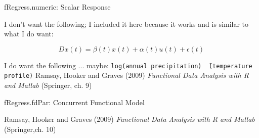 \documentclass[compress]{beamer}
\begin{document}
\begin{frame}{fRegress.numeric:  Scalar Response}



I don't want the following;  I included it here 
because it works and is similar to what I do want:  
\newline 

\[ D x(t) = \beta(t) x(t) + \alpha(t) u(t) + \epsilon(t) \]
\newline \newline \newline 


%




%
I do want the following ... maybe:  \newline
\texttt{log(annual precipitation) \~\ (temperature profile)}
\newline \newline \newline
Ramsay, Hooker and Graves (2009)
\emph{Functional Data Analysis with R and Matlab}
(Springer, ch. 9)

\end{frame}


\begin{frame}{fRegress.fdPar:  Concurrent Functional Model}

Ramsay, Hooker and Graves (2009)
\emph{Functional Data Analysis with R and Matlab}
(Springer,ch. 10)

\end{frame}
\end{document}
